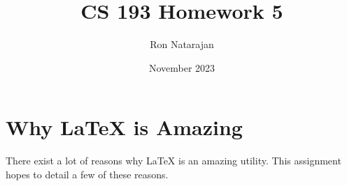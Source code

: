 \documentclass{article}
\title{CS 193 Homework 5}
\author{Ron Natarajan}
\date{November 2023}
\begin{document}
\maketitle

\section{Why LaTeX is Amazing}
There exist a lot of reasons why LaTeX is an amazing utility. This assignment
hopes to detail a few of these reasons.


\newpage

\end{document}

